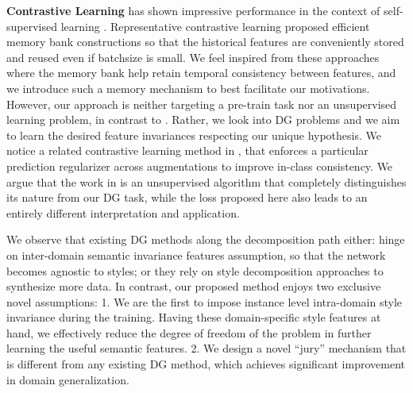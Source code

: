 \documentclass[10pt,twocolumn,letterpaper]{article}
\newcommand{\0}{{\bf 0}}
\begin{document}
\textbf{Contrastive Learning} has shown impressive performance in the context of self-supervised learning \cite{cai2020joint, chen2020simple, he2020momentum,mitrovic2020representation,wang2021low,wu2018unsupervised,yao2021seco}. Representative contrastive learning \cite{he2020momentum} proposed efficient memory bank constructions so that the historical features are conveniently stored and reused even if batchsize is small. We feel inspired from these approaches \cite{he2020momentum} where the memory bank help retain temporal consistency between features, and we introduce such a memory mechanism to best facilitate our motivations. However, our approach is neither targeting a pre-train task nor an unsupervised learning problem, in contrast to \cite{chen2020simple, he2020momentum, wu2018unsupervised}. Rather, we look into DG problems and we aim to learn the desired feature invariances respecting our unique hypothesis. We notice a related contrastive learning method in \cite{mitrovic2020representation}, that enforces a particular prediction regularizer across augmentations to improve in-class consistency. We argue that the work in \cite{mitrovic2020representation} is an unsupervised algorithm that completely distinguishes its nature from our DG task, while the loss proposed here also leads to an entirely different interpretation and application.

We observe that existing DG methods along the decomposition path either: hinge on inter-domain semantic invariance features assumption, so that the network becomes agnostic to styles; or they rely on style decomposition approaches to synthesize more data. In contrast, our proposed method enjoys two exclusive novel assumptions: 1. We are the first to impose instance level intra-domain style invariance during the training. Having these domain-specific style features at hand, we effectively reduce the degree of freedom of the problem in further learning the useful semantic features.  2. We design a novel ``jury'' mechanism that is different from any existing DG method, which achieves significant improvement in domain generalization.
\end{document}
